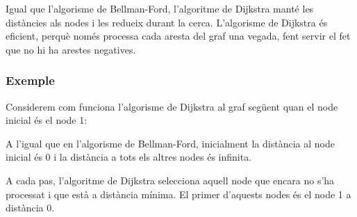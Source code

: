Igual que l'algorisme de Bellman-Ford, l'algoritme de Dijkstra manté
les distàncies als nodes i les redueix durant la cerca. L'algorisme de
Dijkstra és eficient, perquè només processa cada aresta del graf una
vegada, fent servir el fet que no hi ha arestes negatives.

\subsubsection{Exemple}

Considerem com funciona l'algorisme de Dijkstra al graf següent quan
el node inicial és el node 1:
\begin{center}
\end{center}
A l'igual que en l'algorisme de Bellman-Ford, inicialment la distància
al node inicial és 0 i la distància a tots els altres nodes és
infinita.

A cada pas, l'algoritme de Dijkstra selecciona aquell node que encara no
s'ha processat i que està a distància mínima. El primer d'aquests
nodes és el node 1 a distància 0.

